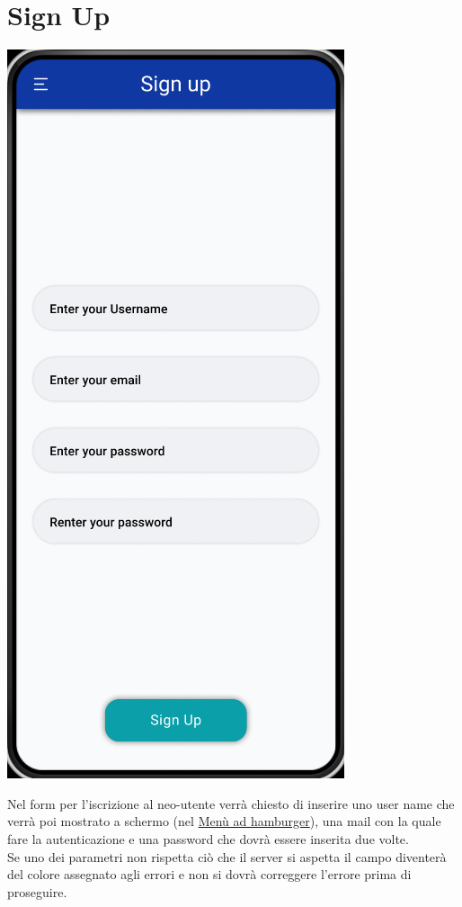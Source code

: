 \documentclass{report}
\begin{document}
\section{Sign Up}

\begin{center}
   \includegraphics[scale=0.4]{sign_up.png}
\end{center}

Nel form per l'iscrizione al neo-utente verrà chiesto di inserire uno user name che verrà poi mostrato a schermo (nel \hyperref[sec:hamburger]{Menù ad hamburger}), una mail con la quale fare la autenticazione e una password che dovrà essere inserita due volte.\\
Se uno dei parametri non rispetta ciò che il server si aspetta il campo diventerà del colore assegnato agli errori e non si dovrà correggere l'errore prima di proseguire.

\printbibliography
\end{document}
